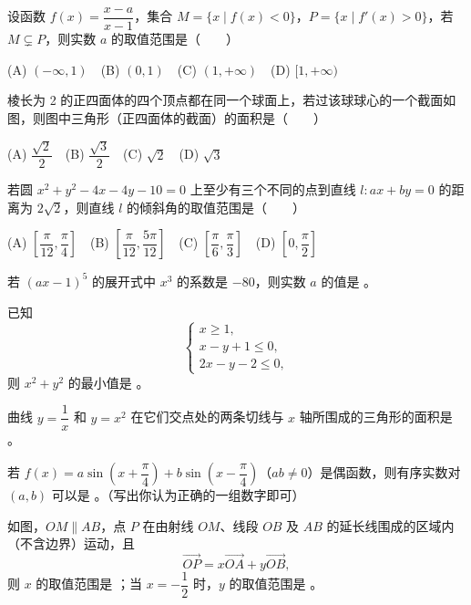 \begin{question}
设函数 $f(x)=\dfrac{x-a}{x-1}$，集合 $M=\{x\mid f(x)<0\}$，$P=\{x\mid f'(x)>0\}$，若 $M\subsetneq P$，则实数 $a$ 的取值范围是\mbox{（　　）}

(A) $(-\infty,1)$　(B) $(0,1)$　(C) $(1,+\infty)$　(D) $[1,+\infty)$

\end{question}
\begin{question}
棱长为 2 的正四面体的四个顶点都在同一个球面上，若过该球球心的一个截面如图，则图中三角形（正四面体的截面）的面积是\mbox{（　　）}

(A) $\dfrac{\sqrt2}{2}$　(B) $\dfrac{\sqrt3}{2}$　(C) $\sqrt2$　(D) $\sqrt3$

\end{question}
\begin{question}
若圆 $x^2+y^2-4x-4y-10=0$ 上至少有三个不同的点到直线 $l:ax+by=0$ 的距离为 $2\sqrt2$，则直线 $l$ 的倾斜角的取值范围是\mbox{（　　）}

(A) $\left[\dfrac\pi{12},\dfrac\pi4\right]$　(B) $\left[\dfrac\pi{12},\dfrac{5\pi}{12}\right]$　(C) $\left[\dfrac\pi6,\dfrac\pi3\right]$　(D) $\left[0,\dfrac\pi2\right]$

\end{question}

\begin{question}
若 $(ax-1)^5$ 的展开式中 $x^3$ 的系数是 $-80$，则实数 $a$ 的值是 \gkblank{}。

\end{question}
\begin{question}
已知
\nopagebreak[4]
\[
\begin{cases}
x\ge1,\\
x-y+1\le0,\\
2x-y-2\le0,
\end{cases}
\]
则 $x^2+y^2$ 的最小值是 \gkblank{}。

\end{question}
\begin{question}
曲线 $y=\dfrac1x$ 和 $y=x^2$ 在它们交点处的两条切线与 $x$ 轴所围成的三角形的面积是 \gkblank{}。

\end{question}
\begin{question}
若 $f(x)=a\sin\left(x+\dfrac\pi4\right)+b\sin\left(x-\dfrac\pi4\right)$（$ab\ne0$）是偶函数，则有序实数对 $(a,b)$ 可以是 \gkblank{}。（写出你认为正确的一组数字即可）

\end{question}
\begin{question}
如图，$OM\parallel AB$，点 $P$ 在由射线 $OM$、线段 $OB$ 及 $AB$ 的延长线围成的区域内（不含边界）运动，且
\nopagebreak[4]
\[
\overrightarrow{OP}=x\overrightarrow{OA}+y\overrightarrow{OB},
\]
则 $x$ 的取值范围是 \gkblank{}；当 $x=-\dfrac12$ 时，$y$ 的取值范围是 \gkblank{}。

\end{question}

